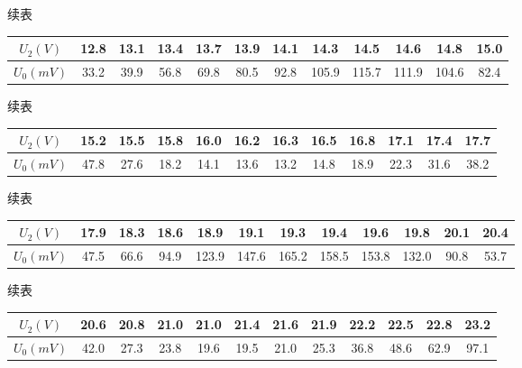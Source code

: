 \documentclass{article}
\begin{document}
    续表

    \begin{center}
        \begin{tabular}{|c|c|c|c|c|c|c|c|c|c|c|c|}
            \hline
            $U_2(V)$ & 12.8  & 13.1  & 13.4  & 13.7  & 13.9  & 14.1  & 14.3  & 14.5  & 14.6  & 14.8  & 15.0  \bigstrut\\
            \hline
            $U_0(mV)$ & 33.2  & 39.9  & 56.8  & 69.8  & 80.5  & 92.8  & 105.9  & 115.7  & 111.9  & 104.6  & 82.4  \bigstrut\\
            \hline
        \end{tabular}%
    \end{center}

    续表

    \begin{center}
        \begin{tabular}{|c|c|c|c|c|c|c|c|c|c|c|c|}
            \hline
            $U_2(V)$ & 15.2  & 15.5  & 15.8  & 16.0  & 16.2  & 16.3  & 16.5  & 16.8  & 17.1  & 17.4  & 17.7  \bigstrut\\
            \hline
            $U_0(mV)$ & 47.8  & 27.6  & 18.2  & 14.1  & 13.6  & 13.2  & 14.8  & 18.9  & 22.3  & 31.6  & 38.2  \bigstrut\\
            \hline
        \end{tabular}%
    \end{center}

    续表

    \begin{center}
        \begin{tabular}{|c|c|c|c|c|c|c|c|c|c|c|c|}
            \hline
            $U_2(V)$ & 17.9  & 18.3  & 18.6  & 18.9  & 19.1  & 19.3  & 19.4  & 19.6  & 19.8  & 20.1  & 20.4  \bigstrut\\
            \hline
            $U_0(mV)$ & 47.5  & 66.6  & 94.9  & 123.9  & 147.6  & 165.2  & 158.5  & 153.8  & 132.0  & 90.8  & 53.7  \bigstrut\\
            \hline
        \end{tabular}%
    \end{center}

    续表

    \begin{center}
        \begin{tabular}{|c|c|c|c|c|c|c|c|c|c|c|c|}
            \hline
            $U_2(V)$ & 20.6  & 20.8  & 21.0  & 21.0  & 21.4  & 21.6  & 21.9  & 22.2  & 22.5  & 22.8  & 23.2  \bigstrut\\
            \hline
            $U_0(mV)$ & 42.0  & 27.3  & 23.8  & 19.6  & 19.5  & 21.0  & 25.3  & 36.8  & 48.6  & 62.9  & 97.1  \bigstrut\\
            \hline
        \end{tabular}%
    \end{center}
\end{document}
